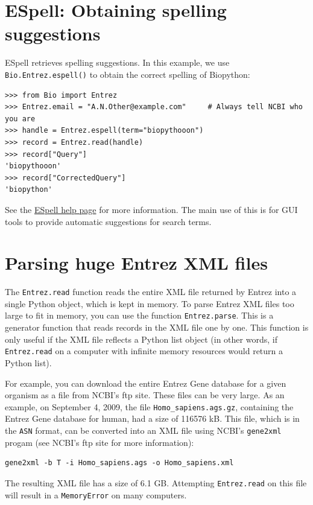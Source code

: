 \documentclass{report}
\begin{document}
\section{ESpell: Obtaining spelling suggestions}
ESpell retrieves spelling suggestions. In this example, we use \verb+Bio.Entrez.espell()+ to obtain the correct spelling of Biopython:

\begin{verbatim}
>>> from Bio import Entrez
>>> Entrez.email = "A.N.Other@example.com"     # Always tell NCBI who you are
>>> handle = Entrez.espell(term="biopythooon")
>>> record = Entrez.read(handle)
>>> record["Query"]
'biopythooon'
>>> record["CorrectedQuery"]
'biopython'
\end{verbatim}
See the \href{http://www.ncbi.nlm.nih.gov/entrez/query/static/espell\_help.html}{ESpell help page} for more information.
The main use of this is for GUI tools to provide automatic suggestions for search terms.

\section{Parsing huge Entrez XML files}

The \verb+Entrez.read+ function reads the entire XML file returned by Entrez into a single Python object, which is kept in memory. To parse Entrez XML files too large to fit in memory, you can use the function \verb+Entrez.parse+. This is a generator function that reads records in the XML file one by one. This function is only useful if the XML file reflects a Python list object (in other words, if \verb+Entrez.read+ on a computer with infinite memory resources would return a Python list).

For example, you can download the entire Entrez Gene database for a given organism as a file from NCBI's ftp site. These files can be very large. As an example, on September 4, 2009, the file \verb+Homo_sapiens.ags.gz+, containing the Entrez Gene database for human, had a size of 116576 kB. This file, which is in the \verb+ASN+ format, can be converted into an XML file using NCBI's \verb+gene2xml+ progam (see NCBI's ftp site for more information):

\begin{verbatim}
gene2xml -b T -i Homo_sapiens.ags -o Homo_sapiens.xml
\end{verbatim}

The resulting XML file has a size of 6.1 GB. Attempting \verb+Entrez.read+ on this file will result in a \verb+MemoryError+ on many computers.
\end{document}
